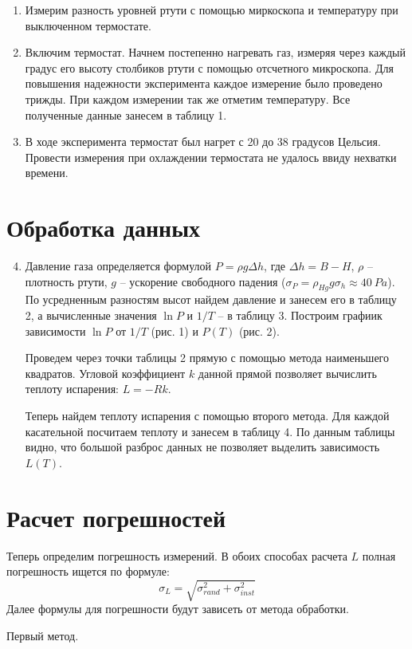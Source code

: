 \documentclass[14pt, a4paper]{report}
\begin{document}
\begin{enumerate}
\item Измерим разность уровней ртути с помощью миркоскопа и температуру при выключенном термостате.

\item Включим термостат. Начнем постепенно нагревать газ, измеряя через каждый градус его высоту столбиков ртути с помощью отсчетного микроскопа. Для повышения надежности эксперимента каждое измерение было проведено трижды. При каждом измерении так же отметим температуру. Все полученные данные занесем в таблицу 1.

\item В ходе эксперимента термостат был нагрет с 20 до 38 градусов Цельсия. Провести измерения при охлаждении термостата не удалось ввиду нехватки времени.

\end{enumerate}

\section{Обработка данных}

\begin{enumerate}
\setcounter{enumi}{3}

\item Давление газа определяется формулой $P=\rho g\Delta h$, где $\Delta h=B-H$, $\rho$ -- плотность ртути, $g$ -- ускорение свободного падения ($\sigma_P=\rho_{Hg} g\sigma_h\approx40\ Pa$). По усредненным разностям высот найдем давление и занесем его в таблицу 2, а вычисленные значения $\ln P$ и $1/T$ -- в таблицу 3. Построим графиик зависимости $\ln P$ от $1/T$ (рис. 1) и $P(T)$ (рис. 2).

Проведем через точки таблицы 2 прямую с помощью метода наименьшего квадратов. Угловой коэффициент $k$ данной прямой позволяет вычислить теплоту испарения: $L=-Rk$.

Теперь найдем теплоту испарения с помощью второго метода. Для каждой касательной посчитаем теплоту и занесем в таблицу 4. По данным таблицы видно, что большой разброс данных не позволяет выделить зависимость $L(T)$.

\end{enumerate}

\section{Расчет погрешностей}

Теперь определим погрешность измерений.
В обоих способах расчета $L$ полная погрешность ищется по формуле:
\[\sigma_L=\sqrt{\sigma^2_{rand}+\sigma^2_{inst}}\]
Далее формулы для погрешности будут зависеть от метода обработки.
\newline\par
Первый метод.
\end{document}
